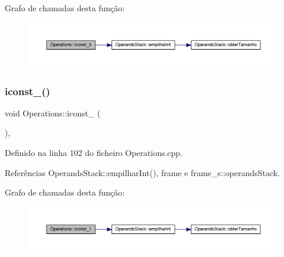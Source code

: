 Grafo de chamadas desta função\+:
\nopagebreak
\begin{figure}[H]
\begin{center}
\leavevmode
\includegraphics[width=350pt]{classOperations_a89879486791daebe6659b96688465c9d_cgraph}
\end{center}
\end{figure}
\mbox{\label{classOperations_a3933ba76ead633a53683ff8491a313ea}} 
\subsubsection{\texorpdfstring{iconst\+\_()}{iconst\_1()}}
{\footnotesize\ttfamily void Operations\+::iconst\+\_ (\begin{DoxyParamCaption}{ }\end{DoxyParamCaption})\hspace{0.3cm}{\ttfamily [static]}, {\ttfamily [private]}}



Definido na linha 102 do ficheiro Operations.\+cpp.



Referências Operands\+Stack\+::empilhar\+Int(), frame e frame\+\_\+s\+::operands\+Stack.

Grafo de chamadas desta função\+:
\nopagebreak
\begin{figure}[H]
\begin{center}
\leavevmode
\includegraphics[width=350pt]{classOperations_a3933ba76ead633a53683ff8491a313ea_cgraph}
\end{center}
\end{figure}
\mbox{\label{classOperations_af1a4f99f0d99da0a7db7fc926932a3c8}} 

